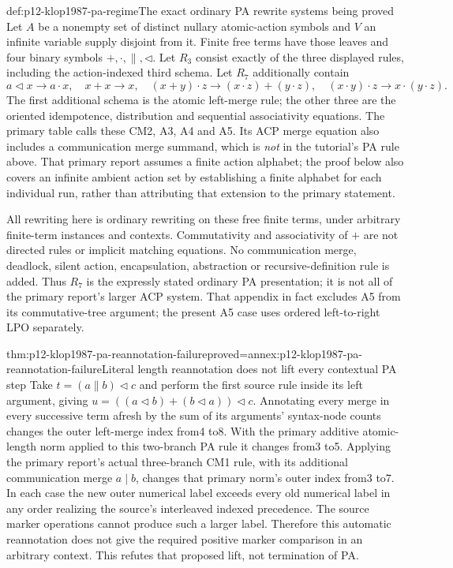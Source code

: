 \begin{hbdefinition}{def:p12-klop1987-pa-regime}{The exact ordinary PA rewrite systems being proved}
Let \(A\) be a nonempty set of distinct nullary atomic-action symbols
and \(V\) an infinite variable supply disjoint from it. Finite free
terms have those leaves and four binary symbols
\(+,\cdot,\parallel,\lhd\). Let \(R_3\) consist exactly of
the three displayed rules, including the action-indexed third schema.
Let \(R_7\) additionally contain
\[
 a\mathbin{\lhd}x\to a\cdot x,\quad x+x\to x,\quad
 (x+y)\cdot z\to(x\cdot z)+(y\cdot z),\quad
 (x\cdot y)\cdot z\to x\cdot(y\cdot z).
\]
The first additional schema is the atomic left-merge rule; the other
three are the oriented idempotence, distribution and sequential
associativity equations. The primary table calls these CM2, A3,
A4 and A5. Its ACP merge equation also includes a communication
merge summand, which is \emph{not} in the tutorial's PA rule above.
That primary report assumes a finite action alphabet; the proof below
also covers an infinite ambient action set by establishing a finite
alphabet for each individual run, rather than attributing that
extension to the primary statement.

All rewriting here is ordinary rewriting on these free finite terms,
under arbitrary finite-term instances and contexts. Commutativity
and associativity of \(+\) are not directed rules or implicit
matching equations. No communication merge, deadlock, silent action,
encapsulation, abstraction or recursive-definition rule is added.
Thus \(R_7\) is the expressly stated ordinary PA presentation;
it is not all of the primary report's larger ACP system. That
appendix in fact excludes A5 from its commutative-tree argument;
the present A5 case uses ordered left-to-right LPO separately.
\end{hbdefinition}

\begin{hblemma}{thm:p12-klop1987-pa-reannotation-failure}{proved=annex:p12-klop1987-pa-reannotation-failure}{Literal length reannotation does not lift every contextual PA step}
Take \(t=(a\parallel b)\mathbin{\lhd}c\) and perform the first
source rule inside its left argument, giving
\(u=((a\mathbin{\lhd}b)+(b\mathbin{\lhd}a))\mathbin{\lhd}c\).
Annotating every merge in every successive term afresh by the sum
of its arguments' syntax-node counts changes the outer left-merge
index from4 to8. With the primary additive atomic-length norm applied
to this two-branch PA rule it changes from3 to5. Applying the primary
report's actual three-branch CM1 rule, with its additional communication
merge \(a\mathbin{|}b\), changes that primary norm's outer index
from3 to7. In each case the new outer numerical label
exceeds every old numerical label in any order realizing the source's
interleaved indexed precedence. The source marker operations cannot
produce such a larger label. Therefore this automatic reannotation
does not give the required positive marker comparison in an arbitrary
context. This refutes that proposed lift, not termination of PA.
\end{hblemma}

